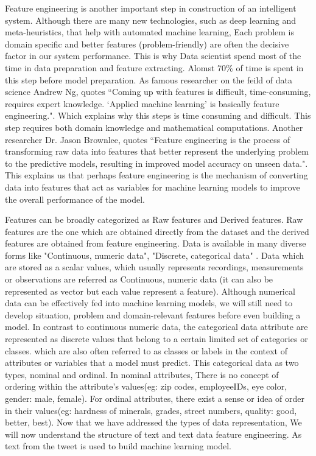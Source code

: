 Feature engineering is another important step in construction of an intelligent system. Although there are many new technologies, such as deep learning and meta-heuristics, that help with automated machine learning, Each problem is domain specific and better features (problem-friendly) are often the decisive factor in our system performance. This is why Data scientist spend most of the time in data preparation and feature extracting. Alomst 70\% of time is spent in this step before model preparation. As famous researcher on the feild of data science Andrew Ng, quotes ``Coming up with features is difficult, time-consuming, requires expert knowledge. `Applied machine learning' is basically feature engineering.". Which explains why this steps is time consuming and difficult. This step requires both domain knowledge and mathematical computations. Another researcher Dr. Jason Brownlee, quotes ``Feature engineering is the process of transforming raw data into features that better represent the underlying problem to the predictive models, resulting in improved model accuracy on unseen data.". This explains us that perhaps feature engineering is the mechanism of converting data into features that act as variables for machine learning models to improve the overall performance of the model.

Features can be broadly categorized as Raw features and Derived features. Raw features are the one which are obtained directly from the dataset and the derived features are obtained from feature engineering. Data is available in many diverse forms like "Continuous, numeric data", "Discrete, categorical data" . Data which are stored as a scalar values, which usually represents recordings, measurements or observations are referred as Continuous, numeric data (it can also be represented as vector but each value represent a feature). Although numerical data can be effectively fed into machine learning models, we will still need to develop situation, problem and domain-relevant features before even building a model. In contrast to continuous numeric data, the categorical data attribute are represented as discrete values that belong to a certain limited set of categories or classes. which are also often referred to as classes or labels in the context of attributes or variables that a model must predict. This categorical data as two types, nominal and ordinal. In nominal attributes, There is no concept of ordering within the attribute's values(eg: zip codes, employeeIDs, eye color, gender: {male, female}). For ordinal attributes, there exist a sense or idea of order in their values(eg: hardness of minerals, grades, street numbers, quality: {good, better,
best}). Now that we have addressed the types of data representation, 
We will now understand the structure of text and text data feature engineering. As text from the tweet is used to build machine learning model. 

